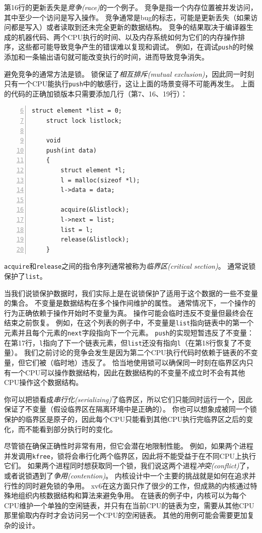 第16行的更新丢失是\emph{竞争(race)}的一个例子。
竞争是指一个内存位置被并发访问，其中至少一个访问是写入操作。
竞争通常是bug的标志，可能是更新丢失（如果访问都是写入）或者读取到还未完全更新的数据结构。
竞争的结果取决于编译器生成的机器代码、两个CPU执行的时间、以及内存系统如何为它们的内存操作排序，这些都可能导致竞争产生的错误难以复现和调试。
例如，在调试\texttt{push}的时候添加和一条输出语句就可能改变执行的时间，进而导致竞争消失。

避免竞争的通常方法是锁。
锁保证了\emph{相互排斥(mutual exclusion)}，因此同一时刻只有一个CPU能执行\texttt{push}中的敏感行，这让上面的场景变得不可能再发生。
上面的代码的正确加锁版本只需要添加几行（第7、16、19行）：
\begin{lstlisting}[numbers=left,firstnumber=6]
    struct element *list = 0;
    struct lock listlock;

    void 
    push(int data)
    {
        struct element *l;
        l = malloc(sizeof *l);
        l->data = data;
        
        acquire(&listlock);
        l->next = list;
        list = l;
        release(&listlock);
    }
\end{lstlisting}

\texttt{acquire}和\texttt{release}之间的指令序列通常被称为\emph{临界区(critical section)}。
通常说锁保护了\texttt{list}。

当我们说锁保护数据时，我们实际上是在说锁保护了适用于这个数据的一些不变量的集合。
不变量是数据结构在多个操作间维护的属性。
通常情况下，一个操作的行为正确依赖于操作开始时不变量为真。
操作可能会临时违反不变量但最终会在结束之前恢复。
例如，在这个列表的例子中，不变量是\texttt{list}指向链表中的第一个元素并且每个元素的\texttt{next}字段指向下一个元素。
\texttt{push}的实现短暂违反了不变量：在第17行，\texttt{l}指向了下一个链表元素，但\texttt{list}还没有指向\texttt{l}（在第18行恢复了不变量）。
我们之前讨论的竞争会发生是因为第二个CPU执行代码时依赖于链表的不变量，但它们被（临时地）违反了。
恰当地使用锁可以确保同一时刻在临界区内只有一个CPU可以操作数据结构，因此在数据结构的不变量不成立时不会有其他CPU操作这个数据结构。

你可以把锁看成\emph{串行化(serializing)}了临界区，所以它们只能同时运行一个，因此保证了不变量（假设临界区在隔离环境中是正确的）。
你也可以想象成被同一个锁保护的临界区是原子的，因此每个CPU只能看到其他CPU执行完临界区之后的变化，而不能看到部分执行时的变化。

尽管锁在确保正确性时非常有用，但它会潜在地限制性能。
例如，如果两个进程并发调用\texttt{kfree}，锁将会串行化两个临界区，因此将不能受益于在不同CPU上执行它们。
如果两个进程同时想获取同一个锁，我们说这两个进程\emph{冲突(conflict)}了，或者说锁遇到了\emph{争用(contention)}。
内核设计中一个主要的挑战就是如何在追求并行性的同时避免锁的争用。
xv6在这方面只作了很少的工作，但成熟的内核通过特殊地组织内核数据结构和算法来避免争用。
在链表的例子中，内核可以为每个CPU维护一个单独的空闲链表，并只有在当前CPU的链表为空，需要从其他CPU那里偷取内存时才会访问另一个CPU的空闲链表。
其他的用例可能会需要更加复杂的设计。

